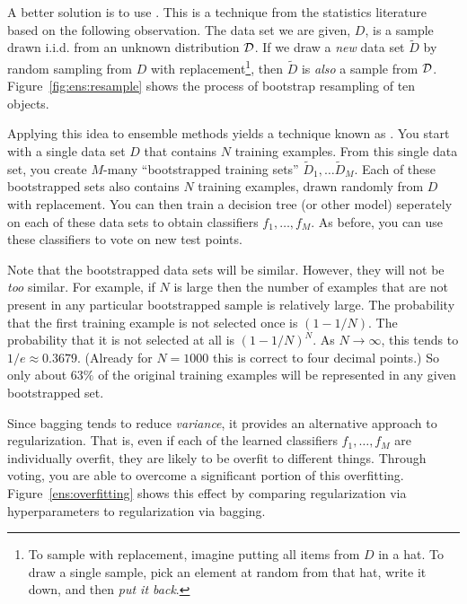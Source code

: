 

A better solution is to use .  This is a
technique from the statistics literature based on the following
observation.  The data set we are given, $D$, is a sample drawn
i.i.d. from an unknown distribution $\mathcal{D}$.  If we draw a \emph{new}
data set $\tilde D$ by random sampling from $D$ with
replacement\footnote{To sample with replacement, imagine putting all
  items from $D$ in a hat.  To draw a single sample, pick an element
  at random from that hat, write it down, and then \emph{put it
    back}.}, then $\tilde D$ is \emph{also} a sample from $\mathcal{D}$.
Figure~\ref{fig:ens:resample} shows the process of bootstrap
resampling of ten objects.

Applying this idea to ensemble methods yields a technique known as
.  You start with a single data set $D$ that contains
$N$ training examples.  From this single data set, you create $M$-many
``bootstrapped training sets'' $\tilde D_1, \dots \tilde D_M$.  Each
of these bootstrapped sets also contains $N$ training examples, drawn
randomly from $D$ with replacement.  You can then train a decision
tree (or other model) seperately on each of these data sets to obtain
classifiers $f_1, \dots, f_M$.  As before, you can use these
classifiers to vote on new test points.

Note that the bootstrapped data sets will be similar.  However, they
will not be \emph{too} similar.  For example, if $N$ is large then the
number of examples that are not present in any particular bootstrapped
sample is relatively large.  The probability that the first training
example is not selected once is $(1- 1/N)$.  The probability that it
is not selected at all is $(1 - 1/N)^N$.  As $N \rightarrow \infty$,
this tends to $1/e \approx 0.3679$.  (Already for $N=1000$ this is correct
to four decimal points.)  So only about $63\%$ of the original
training examples will be represented in any given bootstrapped set.


Since bagging tends to reduce \emph{variance}, it provides an
alternative approach to regularization.  That is, even if each of the
learned classifiers $f_1, \dots, f_M$ are individually overfit, they
are likely to be overfit to different things.  Through voting, you are
able to overcome a significant portion of this overfitting.
Figure~\ref{ens:overfitting} shows this effect by comparing
regularization via hyperparameters to regularization via bagging.

